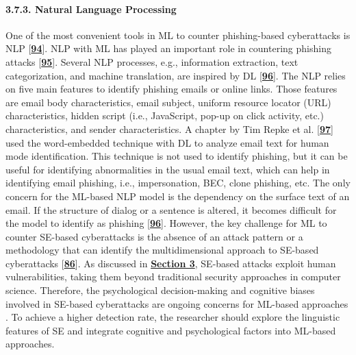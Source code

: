 {\paragraph{3.7.3. Natural Language Processing}

One of the most convenient tools in ML to counter phishing-based cyberattacks is NLP [\href{https://www.mdpi.com/2076-3417/12/12/6042\#B94-applsci-12-06042}{\textbf{94}}]. NLP with ML has played an important role in countering phishing attacks [\href{https://www.mdpi.com/2076-3417/12/12/6042\#B95-applsci-12-06042}{\textbf{95}}]. Several NLP processes, e.g., information extraction, text categorization, and machine translation, are inspired by DL [\href{https://www.mdpi.com/2076-3417/12/12/6042\#B96-applsci-12-06042}{\textbf{96}}]. The NLP relies on five main features to identify phishing emails or online links. Those features are email body characteristics, email subject, uniform resource locator (URL) characteristics, hidden script (i.e., JavaScript, pop-up on click activity, etc.) characteristics, and sender characteristics. A chapter by Tim Repke et al. [\href{https://www.mdpi.com/2076-3417/12/12/6042\#B97-applsci-12-06042}{\textbf{97}}] used the word-embedded technique with DL to analyze email text for human mode identification. This technique is not used to identify phishing, but it can be useful for identifying abnormalities in the usual email text, which can help in identifying email phishing, i.e., impersonation, BEC, clone phishing, etc. The only concern for the ML-based NLP model is the dependency on the surface text of an email. If the structure of dialog or a sentence is altered, it becomes difficult for the model to identify as phishing [\href{https://www.mdpi.com/2076-3417/12/12/6042\#B96-applsci-12-06042}{\textbf{96}}]. However, the key challenge for ML to counter SE-based cyberattacks is the absence of an attack pattern or a methodology that can identify the multidimensional approach to SE-based cyberattacks [\href{https://www.mdpi.com/2076-3417/12/12/6042\#B86-applsci-12-06042}{\textbf{86}}]. As discussed in \href{https://www.mdpi.com/2076-3417/12/12/6042\#sec3-applsci-12-06042}{\textbf{Section 3}}, SE-based attacks exploit human vulnerabilities, taking them beyond traditional security approaches in computer science. Therefore, the psychological decision-making and cognitive biases involved in SE-based cyberattacks are ongoing concerns for ML-based approaches . To achieve a higher detection rate, the researcher should explore the linguistic features of SE and integrate cognitive and psychological factors into ML-based approaches.

}
